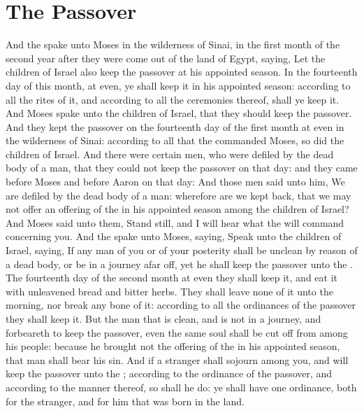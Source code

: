 \section*{The Passover}
\begin{biblechapter} %
\verse And the \LORD spake unto Moses in the wilderness of Sinai, in the first month of the second year after they were come out of the land of Egypt, saying,
\verse Let the children of Israel also keep the passover at his appointed season.
\verse In the fourteenth day of this month, at even, ye shall keep it in his appointed season: according to all the rites of it, and according to all the ceremonies thereof, shall ye keep it.
\verse And Moses spake unto the children of Israel, that they should keep the passover.
\verse And they kept the passover on the fourteenth day of the first month at even in the wilderness of Sinai: according to all that the \LORD commanded Moses, so did the children of Israel.
\verse And there were certain men, who were defiled by the dead body of a man, that they could not keep the passover on that day: and they came before Moses and before Aaron on that day:
\verse And those men said unto him, We are defiled by the dead body of a man: wherefore are we kept back, that we may not offer an offering of the \LORD in his appointed season among the children of Israel?
\verse And Moses said unto them, Stand still, and I will hear what the \LORD will command concerning you.
\verse And the \LORD spake unto Moses, saying,
\verse Speak unto the children of Israel, saying, If any man of you or of your posterity shall be unclean by reason of a dead body, or be in a journey afar off, yet he shall keep the passover unto the \LORD.
\verse The fourteenth day of the second month at even they shall keep it, and eat it with unleavened bread and bitter herbs.
\verse They shall leave none of it unto the morning, nor break any bone of it: according to all the ordinances of the passover they shall keep it.
\verse But the man that is clean, and is not in a journey, and forbeareth to keep the passover, even the same soul shall be cut off from among his people: because he brought not the offering of the \LORD in his appointed season, that man shall bear his sin.
\verse And if a stranger shall sojourn among you, and will keep the passover unto the \LORD; according to the ordinance of the passover, and according to the manner thereof, so shall he do: ye shall have one ordinance, both for the stranger, and for him that was born in the land.

\end{biblechapter}
